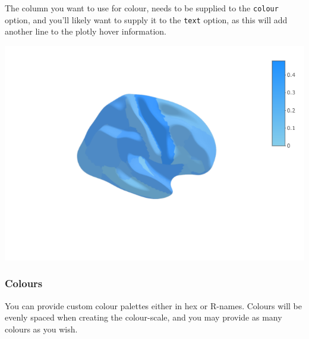 \documentclass[fleqn,10pt]{wlpeerj} %
\newenvironment{Shaded}{\begin{snugshade}}{\end{snugshade}}
\newcommand{\DataTypeTok}[1]{\textcolor[rgb]{0.13,0.29,0.53}{#1}}
\newcommand{\DecValTok}[1]{\textcolor[rgb]{0.00,0.00,0.81}{#1}}
\newcommand{\KeywordTok}[1]{\textcolor[rgb]{0.13,0.29,0.53}{\textbf{#1}}}
\newcommand{\NormalTok}[1]{#1}
\newcommand{\OperatorTok}[1]{\textcolor[rgb]{0.81,0.36,0.00}{\textbf{#1}}}
\newcommand{\StringTok}[1]{\textcolor[rgb]{0.31,0.60,0.02}{#1}}
\begin{document}
The column you want to use for colour, needs to be supplied to the \texttt{colour} option, and you'll likely want to supply it to the \texttt{text} option, as this will add another line to the plotly hover information.

\begin{Shaded}
\end{Shaded}

\includegraphics[width=0.4\linewidth]{png/ggseg3d_data}

\hypertarget{colours}{%
\subsubsection{Colours}\label{colours}}

You can provide custom colour palettes either in hex or R-names.
Colours will be evenly spaced when creating the colour-scale, and you may provide as many colours as you wish.
\end{document}
